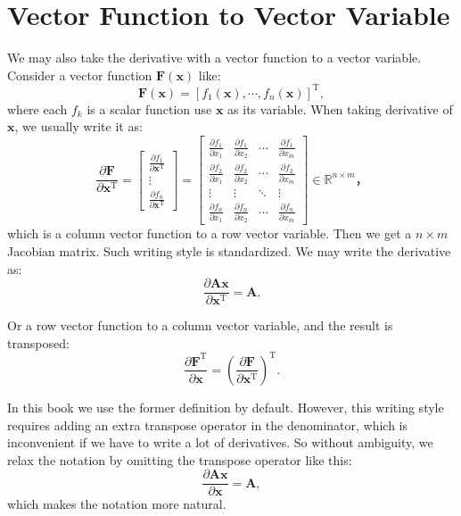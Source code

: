 \section{Vector Function to Vector Variable}
We may also take the derivative with a vector function to a vector variable. Consider a vector function $\bm{F}(\bm{x})$ like: $$\bm{F}(\bm{x}) = [f_1(\bm{x}), \cdots, f_n(\bm{x})]^\mathrm{T},$$ where each $f_k$ is a scalar function use $\bm{x}$ as its variable. When taking derivative of $\bm{x}$, we usually write it as: 
\begin{equation}
	\frac{{\partial \bm{F}}}{{\partial {\bm{x}^\mathrm{T}}}} = \left[ {\begin{array}{*{20}{c}}
			{\frac{{\partial {f_1}}}{{\partial {\bm{x}^\mathrm{T}}}}}\\
			\vdots \\
			{\frac{{\partial {f_n}}}{{\partial {\bm{x}^\mathrm{T}}}}}
	\end{array}} \right] = \left[ {\begin{array}{*{20}{c}}
			{\frac{{\partial {f_1}}}{{\partial {x_1}}}}&{\frac{{\partial {f_1}}}{{\partial {x_2}}}}& \cdots &{\frac{{\partial {f_1}}}{{\partial {x_m}}}}\\
			{\frac{{\partial {f_2}}}{{\partial {x_1}}}}&{\frac{{\partial {f_2}}}{{\partial {x_2}}}}& \cdots &{\frac{{\partial {f_2}}}{{\partial {x_m}}}}\\
			\vdots & \vdots & \ddots & \vdots \\
			{\frac{{\partial {f_n}}}{{\partial {x_1}}}}&{\frac{{\partial {f_n}}}{{\partial {x_2}}}}& \cdots &{\frac{{\partial {f_n}}}{{\partial {x_m}}}}
	\end{array}} \right] \in {\mathbb{R}^{n \times m}}，
\end{equation}
which is a column vector function to a row vector variable. Then we get a $n \times m$ Jacobian matrix. Such writing style is standardized. We may write the derivative as: 
\begin{equation}
	\frac{\partial \bm{Ax}} {\partial\bm{x}^\mathrm{T}} = \bm{A}.
\end{equation}

Or a row vector function to a column vector variable, and the result is transposed: 
\begin{equation}
	\frac{{\partial \bm{F}}^\mathrm{T}}{{\partial {\bm{x}}}}  = \left(\frac{{\partial \bm{F}}}{{\partial {\bm{x}^\mathrm{T}}}} \right)^ \mathrm{T}.
\end{equation}

In this book we use the former definition by default. However, this writing style requires adding an extra transpose operator in the denominator, which is inconvenient if we have to write a lot of derivatives. So without ambiguity, we relax the notation by omitting the transpose operator like this: 
\begin{equation}
	\frac{\partial \bm{Ax}} {\partial\bm{x}} = \bm{A},
\end{equation}
which makes the notation more natural. 

